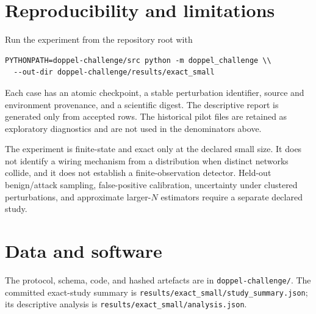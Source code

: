 \documentclass[11pt]{article}
\begin{document}
\section{Reproducibility and limitations}
Run the experiment from the repository root with
\begin{verbatim}
PYTHONPATH=doppel-challenge/src python -m doppel_challenge \\
  --out-dir doppel-challenge/results/exact_small
\end{verbatim}
Each case has an atomic checkpoint, a stable perturbation identifier, source
and environment provenance, and a scientific digest. The descriptive report
is generated only from accepted rows. The historical pilot files are retained
as exploratory diagnostics and are not used in the denominators above.

The experiment is finite-state and exact only at the declared small size. It
does not identify a wiring mechanism from a distribution when distinct
networks collide, and it does not establish a finite-observation detector.
Held-out benign/attack sampling, false-positive calibration, uncertainty
under clustered perturbations, and approximate larger-$N$ estimators require a
separate declared study.

\section*{Data and software}
The protocol, schema, code, and hashed artefacts are in
\texttt{doppel-challenge/}. The committed exact-study summary is
\texttt{results/exact\_small/study\_summary.json}; its descriptive analysis is
\texttt{results/exact\_small/analysis.json}.
\end{document}
